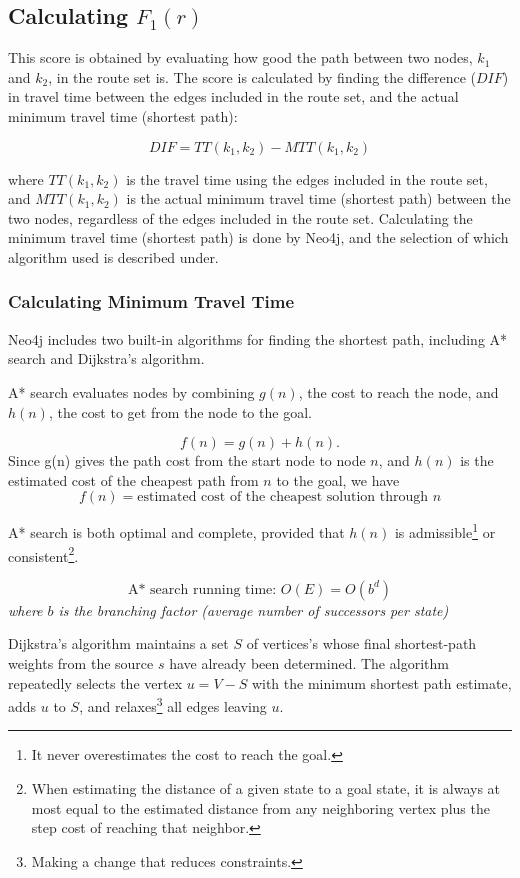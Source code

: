 \subsection{Calculating $F_{1}(r)$}

This score is obtained by evaluating how good the path between two nodes, $k_1$ and $k_2$, in the route set is. The score is calculated by finding the difference ($DIF$) in travel time between the edges included in the route set, and the actual minimum travel time (shortest path):

$$ DIF = TT(k_{1},k_{2}) - MTT(k_{1},k_{2})$$

where $ TT(k_{1},k_{2})$ is the travel time using the edges included in the route set, and $ MTT(k_{1},k_{2})$ is the actual minimum travel time (shortest path) between the two nodes, regardless of the edges included in the route set. Calculating the minimum travel time (shortest path) is done by Neo4j, and the selection of which algorithm used is described under.

\subsubsection{Calculating Minimum Travel Time}

Neo4j includes two built-in algorithms for finding the shortest path, including A* search\citep{russel10}  and Dijkstra's algorithm\citep{cormen09}. 

A* search\cite[p.93-94]{russel10} evaluates nodes by combining $g(n)$, the cost to reach the node, and $h(n)$, the cost to get from the node to the goal.

$$ f(n) = g(n) + h(n).$$
Since g(n) gives the path cost from the start node to node $n$, and $h(n)$ is the estimated cost of the cheapest path from $n$ to the goal, we have
$$f(n) = \text{estimated cost of the cheapest solution through $n$} $$ 

A* search is both optimal and complete, provided that $h(n)$ is admissible\footnote{It never overestimates the cost to reach the goal.} or consistent\footnote{When estimating the distance of a given state to a goal state, it is always at most equal to the estimated distance from any neighboring vertex plus the step cost of reaching that neighbor.}. 

$$ \text{A* search running time: } O(E) = O(b^d)$$
\textit{where $b$ is the branching factor (average number of successors per state)}

Dijkstra's algorithm \cite[p.658-662]{cormen09} maintains a set $S$ of vertices's whose final shortest-path weights from the source $s$ have already been determined. The algorithm repeatedly selects the vertex $u = V - S$ with the minimum shortest path estimate, adds $u$ to $S$, and relaxes\footnote{Making a change that reduces constraints.} all edges leaving $u$.

